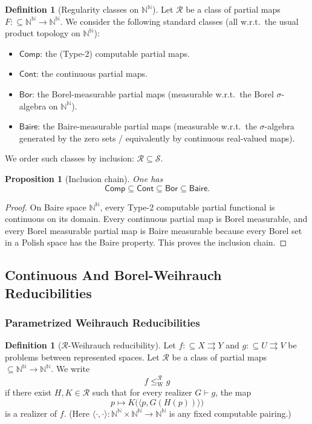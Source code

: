 \documentclass{lmcs} %
\theoremstyle{plain}
\theoremstyle{plain}
\newtheorem{proposition}[theorem]{Proposition}
\theoremstyle{definition}
\newtheorem{definition}[theorem]{Definition}
\theoremstyle{remark}
\theoremstyle{definition}
\theoremstyle{remark}
\numberwithin{equation}{section}
\newcommand{\N}{\mathbb{N}}
\newcommand{\Baire}{\N^\N}
\newcommand{\Bor}{\mathsf{Bor}}
\newcommand{\Cont}{\mathsf{Cont}}
\newcommand{\Comp}{\mathsf{Comp}}
\newcommand{\BaireMeas}{\mathsf{Baire}}
\begin{document}
\begin{definition}[Regularity classes on $\Baire$]\label{def:reg-classes}
Let $\mathcal{R}$ be a class of partial maps $F:\subseteq \Baire\to\Baire$.
We consider the following standard classes (all w.r.t.\ the usual product topology on $\Baire$):
\begin{itemize}
\item $\Comp$: the (Type-2) computable partial maps.
\item $\Cont$: the continuous partial maps.
\item $\Bor$: the Borel-measurable partial maps (measurable w.r.t.\ the Borel $\sigma$-algebra on $\Baire$).
\item $\BaireMeas$: the Baire-measurable partial maps (measurable w.r.t.\ the $\sigma$-algebra generated by the
zero sets / equivalently by continuous real-valued maps).
\end{itemize}
We order such classes by inclusion: $\mathcal{R}\subseteq\mathcal{S}$.
\end{definition}

\begin{proposition}[Inclusion chain]\label{prop:reg-inclusions}
One has
\[
\Comp \subseteq \Cont \subseteq \Bor \subseteq \BaireMeas.
\]
\end{proposition}

\begin{proof}
On Baire space \(\mathbb N^{\mathbb N}\), every Type-2 computable partial functional is continuous on its domain. Every continuous partial map is Borel measurable, and every Borel measurable partial map is Baire measurable because every Borel set in a Polish space has the Baire property. This proves the inclusion chain.
\end{proof}

\subsection{Continuous And Borel-Weihrauch Reducibilities}{\label{sec:ContBorelWeihrauchRed}}
\subsubsection{Parametrized Weihrauch Reducibilities}

\begin{definition}[$\mathcal{R}$-Weihrauch reducibility]\label{def:R-weihrauch}
Let $f:\subseteq X\rightrightarrows Y$ and $g:\subseteq U\rightrightarrows V$ be problems between represented spaces.
Let $\mathcal{R}$ be a class of partial maps $\subseteq\Baire\to\Baire$.
We write
\[
f \le_{\mathrm W}^{\mathcal{R}} g
\]
if there exist $H,K\in \mathcal{R}$ such that for every realizer $G\vdash g$,
the map
\[
p \mapsto K\bigl(\langle p, G(H(p))\rangle\bigr)
\]
is a realizer of $f$. (Here $\langle\cdot,\cdot\rangle:\Baire\times\Baire\to\Baire$ is any fixed computable pairing.)
\end{definition}
\end{document}
